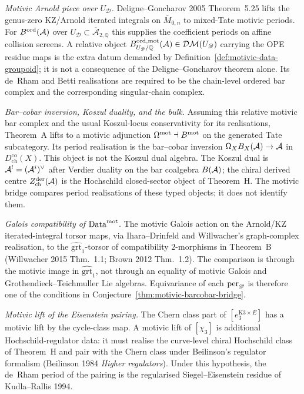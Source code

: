 \begin{remark}
\label{rem:motivic-bridge-evidence}
\emph{Motivic Arnold piece over $U_{\mathscr D}$.}
Deligne--Goncharov 2005 Theorem~5.25 lifts the genus-zero KZ/Arnold
iterated integrals on $\overline{M}_{0,n}$ to mixed-Tate motivic
periods. For $B^{\mathrm{ord}}(\mathcal{A})$ over
$U_{\mathscr D}\subset\overline{\mathcal A}_{2,\mathbb Q}$ this
supplies the coefficient periods on affine collision screens. A
relative object
$B^{\mathrm{ord},\mathrm{mot}}_{U_{\mathscr D}/\mathbb Q}(\mathcal{A})
\in\mathcal{DM}(U_{\mathscr D})$ carrying the OPE residue maps is the
extra datum demanded by
Definition~\ref{def:motivic-data-groupoid}; it is not a consequence of
the Deligne--Goncharov theorem alone. Its de~Rham and Betti
realisations are required to be the chain-level ordered bar complex and
the corresponding singular-chain complex.

\emph{Bar--cobar inversion, Koszul duality, and the bulk.}
Assuming this relative motivic bar complex and the usual Koszul-locus
conservativity for its realisations, Theorem~A lifts to a motivic
adjunction $\Omega^{\mathrm{mot}}\dashv B^{\mathrm{mot}}$ on the generated Tate
subcategory. Its period realisation is the bar--cobar inversion
$\Omega_XB_X(\mathcal{A})\to\mathcal{A}$ in $D^{\mathrm{co}}_{\mathrm{ch}}(X)$. This
object is not the Koszul dual algebra. The Koszul dual is
$\mathcal{A}^!=(\mathcal{A}^i)^\vee$ after Verdier duality on the bar coalgebra
$B(\mathcal{A})$; the chiral derived centre
$Z^{\mathrm{der}}_{\mathrm{ch}}(\mathcal{A})$ is the Hochschild closed-sector object of
Theorem~H. The motivic bridge compares period realisations of these
typed objects; it does not identify them.

\emph{Galois compatibility of $\mathrm{Data}^{\mathrm{mot}}$.}
The motivic Galois action on the Arnold/KZ iterated-integral torsor
maps, via Ihara--Drinfeld and Willwacher's graph-complex realisation, to
the $\widehat{\mathrm{grt}}_1$-torsor of compatibility $2$-morphisms in
Theorem~B (Willwacher 2015 Thm.~1.1; Brown 2012 Thm.~1.2). The
comparison is through the motivic image in $\widehat{\mathrm{grt}}_1$,
not through an equality of motivic Galois and Grothendieck--Teichmuller
Lie algebras. Equivariance of each $\mathrm{per}_{\mathscr D}$ is therefore
one of the conditions in
Conjecture~\ref{thm:motivic-barcobar-bridge}.

\emph{Motivic lift of the Eisenstein pairing.}
The Chern class part of
$[e_3^{\mathrm{K3}\times E}]$ has a motivic lift by the cycle-class map.
A motivic lift of $[\chi_3]$ is additional Hochschild-regulator data:
it must realise the curve-level chiral Hochschild class of Theorem~H and
pair with the Chern class under Beilinson's regulator formalism
(Beilinson 1984 \emph{Higher regulators}). Under this hypothesis, the
de~Rham period of the pairing is the regularised Siegel--Eisenstein
residue of Kudla--Rallis 1994.


\end{remark}
